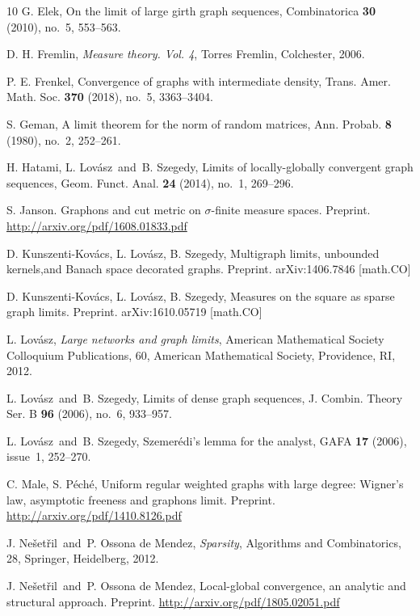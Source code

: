 \documentclass[a4wider]{amsart}
\theoremstyle{definitionbreak}\newtheorem{D}[theorem]{Definition}
\theoremstyle{definitionbreak}\newtheorem*{D*}{Definition}
\begin{document}
\begin{thebibliography}{10}
 G. Elek, On the limit of large girth graph sequences, Combinatorica {\bf 30} (2010), no.~5, 553--563.

 D. H. Fremlin, {\it Measure theory. Vol. 4}, Torres Fremlin, Colchester, 2006. 

 P. E. Frenkel, Convergence of graphs with intermediate density, Trans. Amer. Math. Soc. {\bf 370} (2018), no.~5, 3363--3404.

 S. Geman, A limit theorem for the norm of random matrices, Ann. Probab. {\bf 8} (1980), no.~2, 252--261.

 H. Hatami, L. Lov\'asz\ and\ B. Szegedy, Limits of locally-globally convergent graph sequences, Geom. Funct. Anal. {\bf 24} (2014), no.~1, 269--296.

 S. Janson.  Graphons and cut metric on $\sigma$-finite measure spaces.  Preprint. \url{http://arxiv.org/pdf/1608.01833.pdf}

 D. Kunszenti-Kov\'acs, L. Lov\'asz, B. Szegedy, Multigraph limits, unbounded kernels,and Banach space decorated graphs. Preprint.  arXiv:1406.7846 [math.CO]

 D. Kunszenti-Kov\'acs, L. Lov\'asz, B. Szegedy, Measures on the square as sparse graph limits. Preprint. arXiv:1610.05719 [math.CO]



 L. Lov\'asz, {\it Large networks and graph limits}, American Mathematical Society Colloquium Publications, 60, American Mathematical Society, Providence, RI, 2012.

 L. Lov\'asz\ and\ B. Szegedy, Limits of dense graph sequences, J. Combin. Theory Ser. B {\bf 96} (2006), no.~6, 933--957.

 L. Lov\'asz\ and\ B. Szegedy, Szemer\'edi's lemma for the analyst, GAFA {\bf 17} (2006), issue~1, 252--270.

  C. Male, S. P\'ech\'e, Uniform regular weighted graphs with large degree: Wigner's law, asymptotic freeness and graphons limit. Preprint. \url{http://arxiv.org/pdf/1410.8126.pdf} 

 J. Ne\v set\v ril\ and\ P. Ossona de Mendez, {\it Sparsity}, Algorithms and Combinatorics, 28, Springer, Heidelberg, 2012. 


 J. Ne\v set\v ril\ and\ P. Ossona de Mendez, Local-global convergence, an analytic and structural approach. Preprint. \url{http://arxiv.org/pdf/1805.02051.pdf}


\end{thebibliography}
\end{document}
